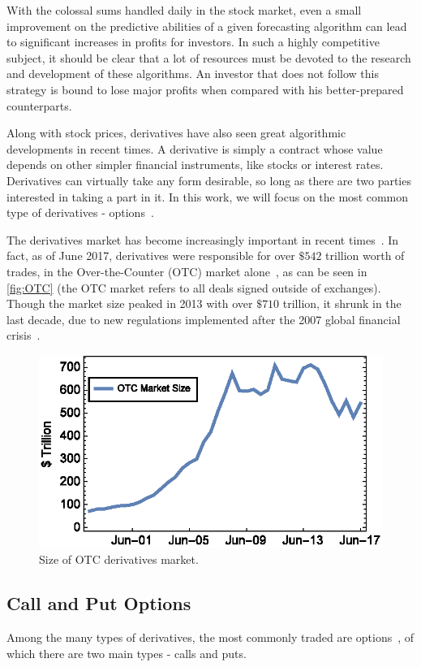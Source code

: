 \documentclass[a4paper,twocolumn,aps,prd,longbibliography,superscriptaddress]{revtex4-1}
\begin{document}
With the colossal sums handled daily in the stock market, even a small improvement on the predictive abilities of a given forecasting algorithm can lead to significant increases in profits for investors. In such a highly competitive subject, it should be clear that a lot of resources must be devoted to the research and development of these algorithms. An investor that does not follow this strategy is bound to lose major profits when compared with his better-prepared counterparts.




Along with stock prices, derivatives have also seen great algorithmic developments in recent times. A derivative is simply a contract whose value depends on other simpler financial instruments, like stocks or interest rates. Derivatives can virtually take any form desirable, so long as there are two parties interested in taking a part in it. In this work, we will focus on the most common type of derivatives - options~\cite{Hull}.

The derivatives market has become increasingly important in recent times~\cite{Hull}. In fact, as of June 2017, derivatives were responsible for over $\$542$ trillion worth of trades, in the Over-the-Counter (OTC) market alone~\cite{BIS}, as can be seen in \autoref{fig:OTC} (the OTC market refers to all deals signed outside of exchanges). Though the market size peaked in 2013 with over $\$710$ trillion, it shrunk in the last decade, due to new regulations implemented after the 2007 global financial crisis~\cite{FT}.

\begin{figure}[H]
    \centering
      \includegraphics[width=.9\columnwidth,trim={2pt 17pt 0 0},clip]{OTC.eps}
      \caption{Size of OTC derivatives market.}\label{fig:OTC}
    \end{figure}

\subsection{Call and Put Options}
Among the many types of derivatives, the most commonly traded are options~\cite{Hull}, of which there are two main types - calls and puts.
\end{document}
